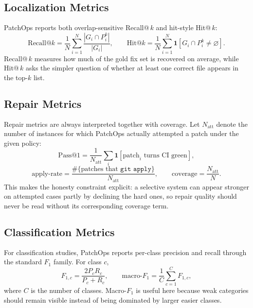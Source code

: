 \subsection{Localization Metrics}

PatchOps reports both overlap-sensitive Recall@\(\,k\) and hit-style Hit@\(\,k\):
\begin{equation}
\mathrm{Recall@}k = \frac{1}{N}\sum_{i=1}^{N}\frac{|G_i \cap P_i^k|}{|G_i|},
\qquad
\mathrm{Hit@}k = \frac{1}{N}\sum_{i=1}^{N}\mathbf{1}\!\left[G_i \cap P_i^k \neq \varnothing\right].
\end{equation}
Recall@\(\,k\) measures how much of the gold fix set is recovered on average, while Hit@\(\,k\) asks the
simpler question of whether at least one correct file appears in the top-\(k\) list.

\subsection{Repair Metrics}

Repair metrics are always interpreted together with coverage. Let \(N_{\mathrm{att}}\) denote the number of
instances for which PatchOps actually attempted a patch under the given policy:
\begin{equation}
\mathrm{Pass@1} = \frac{1}{N_{\mathrm{att}}}\sum_i \mathbf{1}[\text{patch}_i \text{ turns CI green}],
\end{equation}
\begin{equation}
\mathrm{apply\text{-}rate} = \frac{\#\{\text{patches that } \texttt{git apply}\}}{N_{\mathrm{att}}},
\qquad
\mathrm{coverage} = \frac{N_{\mathrm{att}}}{N}.
\end{equation}
This makes the honesty constraint explicit: a selective system can appear stronger on attempted cases partly by
declining the hard ones, so repair quality should never be read without its corresponding coverage term.

\subsection{Classification Metrics}

For classification studies, PatchOps reports per-class precision and recall through the standard \(F_1\) family.
For class \(c\),
\begin{equation}
F_{1,c} = \frac{2P_cR_c}{P_c + R_c},
\qquad
\mathrm{macro\text{-}}F_1 = \frac{1}{C}\sum_{c=1}^{C}F_{1,c},
\end{equation}
where \(C\) is the number of classes. Macro-\(F_1\) is useful here because weak categories should remain
visible instead of being dominated by larger easier classes.

